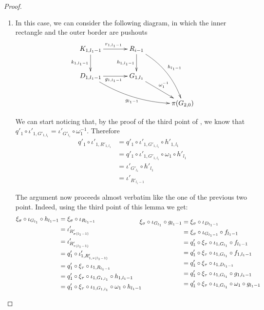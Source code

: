 \begin{proof}
\begin{enumerate}
			\item In this case, we can consider the following diagram, in which the inner rectangle and the outer border are pushouts
		\[\xymatrix@C=35pt{K_{1,l_1-1}\ar[r]^{r_{1,l_1-1}} \ar[d]_{k_{1,l_1-1}}& R_{i-1} \ar[d]_{h_{1,l_1-1}} \ar@/^.4cm/[ddr]^{h_{l_1-1}}\\ D_{1,l_1-1} \ar[r]_{g_{1,l_1-1}} \ar@/_.4cm/[drr]_{g_{l_1-1}}& G_{1,l_1} \ar[dr]^{\omega_1^{-1}}\\ &&\pi(G_{2,0})}\] 
		
		\iffalse 
	\[	\xi_\sigma \circ \iota_{G_{l_1}}=q'_1 \circ \xi_{\tau} \circ \iota_{1, G_{l_1}}\circ \omega_1\]
	\fi 
		We can start noticing that, by the proof of  the third point of , we know that  $q'_1\circ \iota'_{1, G'_{1,l_1}}=\iota'_{G'_{l_1}} \circ \omega_1^{-1}$. Therefore
		\begin{align*}q'_1\circ \iota'_{1, R'_{1,l_1}}&=q'_1\circ \iota'_{1, G'_{1,l_1}}\circ  h'_{1, l_1}\\&=q'_1\circ \iota'_{1, G'_{1,l_1}}\circ \omega_1 \circ  h'_{ l_1}\\&= \iota'_{G'_{l_1}}\circ h'_{l_1}\\&=\iota'_{R'_{l_1-1}}
		\end{align*}
		
		The argument now proceeds almost verbatim like the one of the previous two point. Indeed, using the third point of this lemma we get:
		\[\begin{split}
			\xi_\sigma \circ \iota_{G_{l_1}}\circ h_{l_1-1}&=  \xi_\sigma\circ \iota_{R_{l_1-1}}\\&=\iota'_{R'_{\sigma(l_1-1)}}\\&=\iota'_{R'_{\tau(l_1-1)}}\\&=q'_1\circ \iota'_{1, R'_{1,\tau(l_1-1)}}\\&=q'_1\circ \xi_{\tau}\circ \iota_{1, R_{l_1-1}}\\&=q'_1\circ \xi_{\tau} \circ \iota_{1, G_{1,l_1}}\circ h_{1, l_1-1}\\&=q'_1\circ \xi_\tau \circ \iota_{1, G_{1, l_1}} \circ \omega_1 \circ  h_{l_1-1}			\end{split}   	\hspace{-5pt}	\begin{split}
			\xi_\sigma \circ \iota_{G_{l_1}}\circ g_{l_1-1}&=\xi_{\sigma}\circ \iota_{D_{l_1-1}}\\&=\xi_{\sigma}\circ \iota_{G_{l_1-1}} \circ f_{l_1-1}\\&=q'_1 \circ \xi_{\tau} \circ \iota_{1, G_{l_1}} \circ f_{l_1-1}\\&=q'_1 \circ \xi_{\tau} \circ \iota_{1, G_{l_1}} \circ f_{1, {l_1}-1}\\&=q'_1 \circ \xi_{\tau} \circ \iota_{1, D_{{l_1}-1}}\\&=q'_1 \circ \xi_{\tau} \circ \iota_{1, G_{l_1}}\circ g_{1, l_1-1}\\&=q'_1 \circ \xi_{\tau} \circ \iota_{1, G_{l_1}}\circ \omega_1\circ g_{l_1-1}
			\end{split}\]
			

\end{enumerate}
\end{proof}
